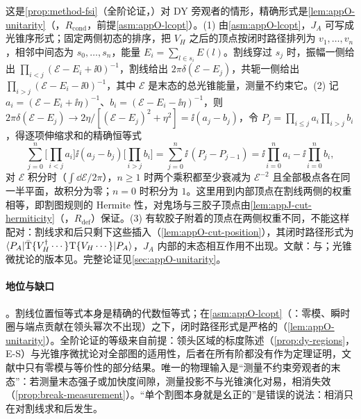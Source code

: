\begin{proofsketch}
这是\cref{prop:method-fsi}（全阶论证，\tagA）对 DY 旁观者的情形，精确形式是\cref{lem:appO-unitarity}（\tagR，$R_{\mathrm{cond}}$，前提\cref{asm:appO-lcopt}）。(1) 由\cref{asm:appO-lcopt}，$J_A$ 可写成光锥序形式；固定两侧初态的排序，把 $V_H$ 之后的顶点按闭时路径排列为 $v_1,\dots,v_n$，相邻中间态为 $s_0,\dots,s_n$，能量 $E_i=\sum_{l\in s_i}E(l)$。割线穿过 $s_j$ 时，振幅一侧给出 $\prod_{i<j}(\mathcal E-E_i+\ii0)^{-1}$，割线给出 $2\pi\delta(\mathcal E-E_j)$，共轭一侧给出 $\prod_{i>j}(\mathcal E-E_i-\ii0)^{-1}$，其中 $\mathcal E$ 是末态的总光锥能量，测量不约束它。(2) 记 $a_i=(\mathcal E-E_i+\ii\eta)^{-1}$、$b_i=(\mathcal E-E_i-\ii\eta)^{-1}$，则 $2\pi\delta(\mathcal E-E_j)\to2\eta/[(\mathcal E-E_j)^2+\eta^2]=\ii(a_j-b_j)$，令 $P_j=\prod_{i\le j}a_i\prod_{i>j}b_i$，得逐项伸缩求和的精确恒等式
\[
\sum_{j=0}^{n}\Big[\prod_{i<j}a_i\Big]\ii(a_j-b_j)\Big[\prod_{i>j}b_i\Big]=\sum_{j=0}^n\ii\,(P_j-P_{j-1})=\ii\prod_{i=0}^na_i-\ii\prod_{i=0}^nb_i ,
\]
对 $\mathcal E$ 积分时（$\int\dd\mathcal E/2\pi$），$n\ge1$ 时两个乘积都至少衰减为 $\mathcal E^{-2}$ 且全部极点各在同一半平面，故积分为零；$n=0$ 时积分为 $1$。这里用到内部顶点在割线两侧的权重相等，即割图规则的 Hermite 性，对鬼场与三胶子顶点由\cref{lem:appJ-cut-hermiticity}（\tagR，$R_{\mathrm{def}}$）保证。(3) 有软胶子附着的顶点在两侧权重不同，不能这样配对：割线求和后只剩下这些插入（\cref{lem:appO-cut-position}），其闭时路径形式为 $\langle P_A|\bar{\rm T}\{V_H^\dagger\cdots\}{\rm T}\{V_H\cdots\}|P_A\rangle$，$J_A$ 内部的末态相互作用不出现。文献：\cite{CollinsSoperSterman1985b,CollinsSoperSterman1988,Bodwin1985}与\cite[第~14.4~节]{Collins2011}；光锥微扰论的版本见\cite[第~4~节]{Diehl:2015bca}。完整论证见\cref{sec:appO-unitarity}。
\end{proofsketch}

\paragraph{地位与缺口}\tagA。割线位置恒等式本身是精确的代数恒等式；在\cref{asm:appO-lcopt}（\tagA：零模、瞬时圈与端点贡献在领头幂次不出现）之下，闭时路径形式是严格的（\cref{lem:appO-unitarity}）。全阶论证的等级来自前提：领头区域的标度陈述（\cref{prop:dy-regions}，E-S）与光锥序微扰论对全部图的适用性，后者在所有阶都没有作为定理证明，文献中只有零模与等价性的部分结果。唯一的物理输入是“测量不约束旁观者的末态”：若测量末态强子或加快度间隙，测量投影不与光锥演化对易，相消失效（\cref{prop:break-measurement}）。“单个割图本身就是幺正的”是错误的说法：相消只在对割线求和后发生。

